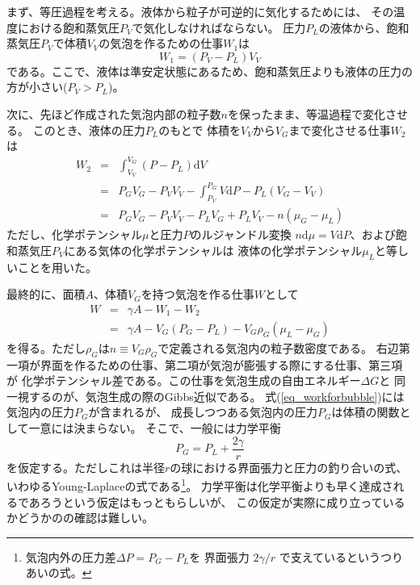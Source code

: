 \documentclass{jarticle}
\newcommand{\diff}{\mathrm d}
\begin{document}
まず、等圧過程を考える。液体から粒子が可逆的に気化するためには、
その温度における飽和蒸気圧$P_V$で気化しなければならない。
圧力$P_L$の液体から、飽和蒸気圧$P_V$で体積$V_V$の気泡を作るための仕事$W_1$は
$$
    W_1 = (P_V - P_L)V_V
$$
である。ここで、液体は準安定状態にあるため、飽和蒸気圧よりも液体の圧力の方が小さい($P_V>P_L$)。

次に、先ほど作成された気泡内部の粒子数$n$を保ったまま、等温過程で変化させる。
このとき、液体の圧力$P_L$のもとで
体積を$V_V$から$V_G$まで変化させる仕事$W_2$は
\begin{eqnarray}
    W_2 &=& \int_{V_V}^{V_G} (P-P_L)\diff V \\
    &=& P_G V_G - P_V V_V - \int_{P_V}^{P_G}V \diff P - P_L(V_G - V_V) \\
    &=& P_G V_G - P_V V_V - P_L V_G + P_L V_V - n (\mu_G - \mu_L)
\end{eqnarray}
ただし、化学ポテンシャル$\mu$と圧力$P$のルジャンドル変換
$n \diff \mu = V \diff P$、および飽和蒸気圧$P_V$にある気体の化学ポテンシャルは
液体の化学ポテンシャル$\mu_L$と等しいことを用いた。

最終的に、面積$A$、体積$V_G$を持つ気泡を作る仕事$W$として
\begin{eqnarray}
    W &=& \gamma A - W_1 - W_2\\
    &=& \gamma A - V_G (P_G - P_L) - V_G \rho_G (\mu_L - \mu_G) \label{eq_workforbubble}
\end{eqnarray}
を得る。ただし$\rho_G$は$n \equiv V_G \rho_G$で定義される気泡内の粒子数密度である。
右辺第一項が界面を作るための仕事、第二項が気泡が膨張する際にする仕事、第三項が
化学ポテンシャル差である。この仕事を気泡生成の自由エネルギー$\Delta G$と
同一視するのが、気泡生成の際のGibbs近似である。
式(\ref{eq_workforbubble})には気泡内の圧力$P_G$が含まれるが、
成長しつつある気泡内の圧力$P_G$は体積の関数として一意には決まらない。
そこで、一般には力学平衡
\begin{equation}
    P_G = P_L + \frac{2\gamma}{r}
\end{equation}
を仮定する。ただしこれは半径$r$の球における界面張力と圧力の釣り合いの式、
いわゆるYoung-Laplaceの式である\footnote{気泡内外の圧力差$\Delta P = P_G - P_L$を
    界面張力 $2\gamma /r$ で支えているというつりあいの式。}。
力学平衡は化学平衡よりも早く達成されるであろうという仮定はもっともらしいが、
この仮定が実際に成り立っているかどうかのの確認は難しい。
\end{document}

